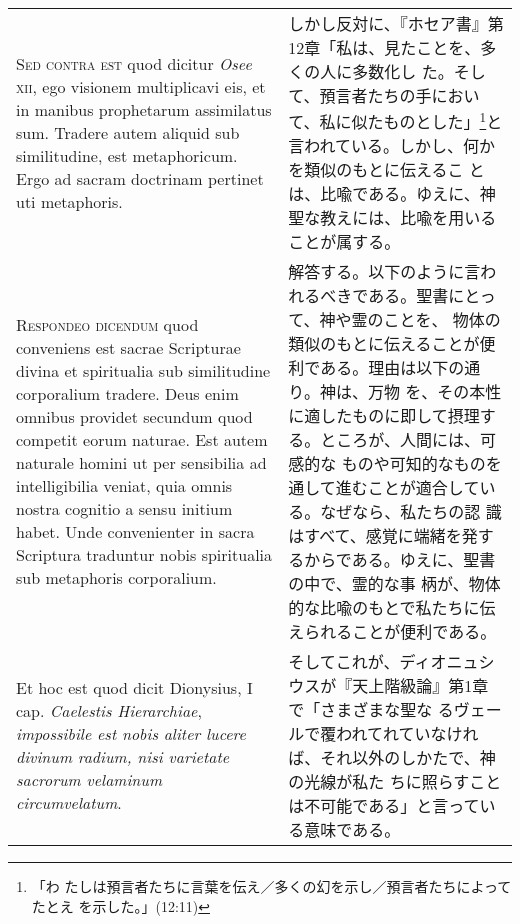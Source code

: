 \documentclass[10pt]{jsarticle}
\begin{document}
\begin{longtable}{p{21em}p{21em}}
\\


{\scshape Sed contra est} quod dicitur {\itshape Osee} {\scshape xii},
ego visionem multiplicavi eis, et in manibus prophetarum assimilatus
sum. Tradere autem aliquid sub similitudine, est metaphoricum. Ergo ad
sacram doctrinam pertinet uti metaphoris.


&

しかし反対に、『ホセア書』第12章「私は、見たことを、多くの人に多数化し
た。そして、預言者たちの手において、私に似たものとした」\footnote{「わ
たしは預言者たちに言葉を伝え／多くの幻を示し／預言者たちによってたとえ
を示した。」(12:11)}と言われている。しかし、何かを類似のもとに伝えるこ
とは、比喩である。ゆえに、神聖な教えには、比喩を用いることが属する。



\\


{\scshape Respondeo dicendum} quod conveniens est sacrae Scripturae
divina et spiritualia sub similitudine corporalium tradere. Deus enim
omnibus providet secundum quod competit eorum naturae. Est autem
naturale homini ut per sensibilia ad intelligibilia veniat, quia omnis
nostra cognitio a sensu initium habet. Unde convenienter in sacra
Scriptura traduntur nobis spiritualia sub metaphoris corporalium.


&

解答する。以下のように言われるべきである。聖書にとって、神や霊のことを、
物体の類似のもとに伝えることが便利である。理由は以下の通り。神は、万物
を、その本性に適したものに即して摂理する。ところが、人間には、可感的な
ものや可知的なものを通して進むことが適合している。なぜなら、私たちの認
識はすべて、感覚に端緒を発するからである。ゆえに、聖書の中で、霊的な事
柄が、物体的な比喩のもとで私たちに伝えられることが便利である。



\\

Et hoc est quod dicit Dionysius, I cap. {\itshape Caelestis
Hierarchiae}, {\itshape impossibile est nobis aliter lucere divinum
radium, nisi varietate sacrorum velaminum circumvelatum}.


&

そしてこれが、ディオニュシウスが『天上階級論』第1章で「さまざまな聖な
るヴェールで覆われてれていなければ、それ以外のしかたで、神の光線が私た
ちに照らすことは不可能である」と言っている意味である。

\\


\end{longtable}
\end{document}
